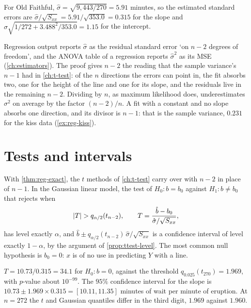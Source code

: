 For Old Faithful, $\hat{\sigma} = \sqrt{9{,}443/270} = 5.91$ minutes, so the estimated standard errors are $\hat{\sigma}/\sqrt{S_{xx}} = 5.91/\sqrt{353.0} = 0.315$ for the slope and $\hat{\sigma}\sqrt{1/272 + 3.488^2/353.0} = 1.15$ for the intercept.

\begin{bridge}
Regression output reports $\hat{\sigma}$ as the residual standard error `on $n - 2$ degrees of freedom', and the ANOVA table of a regression reports $\hat{\sigma}^2$ as its MSE (\cref{ch:estimators}). The proof gives $n - 2$ the reading that the sample variance's $n - 1$ had in \cref{ch:t-test}: of the $n$ directions the errors can point in, the fit absorbs two, one for the height of the line and one for its slope, and the residuals live in the remaining $n - 2$. Dividing by $n$, as maximum likelihood does, underestimates $\sigma^2$ on average by the factor $(n - 2)/n$. A fit with a constant and no slope absorbs one direction, and its divisor is $n - 1$: that is the sample variance, $0.231$ for the kiss data (\cref{ex:reg-kiss}).
\end{bridge}

\section{Tests and intervals}
\label{sec:reg-inference}

With \cref{thm:reg-exact}, the $t$ methods of \cref{ch:t-test} carry over with $n - 2$ in place of $n - 1$.
In the Gaussian linear model, the test of $H_0: b = b_0$ against $H_1: b \neq b_0$ that rejects when
\[
\lvert T\rvert > q_{\alpha/2}(t_{n-2}), \qquad T = \frac{\hat{b} - b_0}{\hat{\sigma}/\sqrt{S_{xx}}},
\]
has level exactly $\alpha$, and $\hat{b} \pm q_{\alpha/2}(t_{n-2})\,\hat{\sigma}/\sqrt{S_{xx}}$ is a confidence interval of level exactly $1 - \alpha$, by the argument of \cref{prop:ttest-level}.
The most common null hypothesis is $b_0 = 0$: $x$ is of no use in predicting $Y$ with a line.

\begin{worked}
$T = 10.73/0.315 = 34.1$ for $H_0: b = 0$, against the threshold $q_{0.025}(t_{270}) = 1.969$, with $p$-value about $10^{-99}$. The $95\%$ confidence interval for the slope is $10.73 \pm 1.969 \times 0.315 = [10.11, 11.35]$ minutes of wait per minute of eruption. At $n = 272$ the $t$ and Gaussian quantiles differ in the third digit, $1.969$ against $1.960$.
\end{worked}

